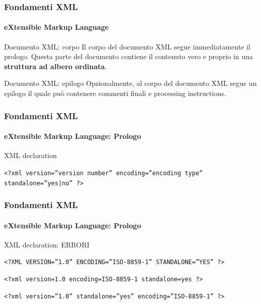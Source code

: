 \begin{frame}
	\frametitle{Fondamenti XML}
	\framesubtitle{eXtensible Markup Language}
	\addtocounter{nframe}{1}

	\begin{block}{Documento XML: corpo}
		Il corpo del documento XML segue immediatamente il prologo. Questa parte del documento contiene il contenuto vero e proprio in una \textbf{struttura ad albero ordinata}.
	\end{block}

	\begin{block}{Documento XML: epilogo}
		Opzionalmente, al corpo del documento XML segue un epilogo il quale può contenere commenti finali e processing instructions.
	\end{block}
	

\end{frame}

\begin{frame}
	\frametitle{Fondamenti XML}
	\framesubtitle{eXtensible Markup Language: Prologo}
	\addtocounter{nframe}{1}

	\begin{block}{XML declaration}
    \begin{center}\texttt{<?xml version=”version number” encoding=”encoding type” standalone=”yes|no” ?>}\end{center}
	\end{block}

\end{frame}


\begin{frame}
	\frametitle{Fondamenti XML}
	\framesubtitle{eXtensible Markup Language: Prologo}
	\addtocounter{nframe}{1}

	\begin{block}{XML declaration: ERRORI}
	\begin{center}\texttt{<?XML VERSION=”1.0” ENCODING=”ISO-8859-1” STANDALONE=”YES” ?>}\end{center}
	\begin{center}\texttt{<?xml version=1.0 encoding=ISO-8859-1 standalone=yes ?>}\end{center}
	\begin{center}\texttt{<?xml version=”1.0” standalone=”yes” encoding=”ISO-8859-1” ?>}\end{center}
	\end{block}

\end{frame}

